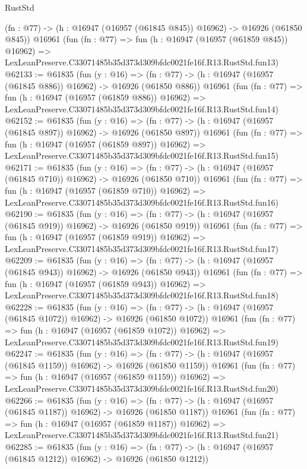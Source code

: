 \begin{lexlean}{RustStd}
\begin{coremodule}
    (fn : @77) -> (h : @16947 (@16957 (@61845 @845)) @16962) -> @16926 (@61850 @845))
    @16961
    (fun (fn : @77) =>
    fun (h : @16947 (@16957 (@61859 @845)) @16962) =>
    LexLeanPreserve.C33071485b35d373d309bfdc0021fe16f.R13.RustStd.fun13)
@62133 := @61835
    (fun (y : @16) =>
    (fn : @77) -> (h : @16947 (@16957 (@61845 @886)) @16962) -> @16926 (@61850 @886))
    @16961
    (fun (fn : @77) =>
    fun (h : @16947 (@16957 (@61859 @886)) @16962) =>
    LexLeanPreserve.C33071485b35d373d309bfdc0021fe16f.R13.RustStd.fun14)
@62152 := @61835
    (fun (y : @16) =>
    (fn : @77) -> (h : @16947 (@16957 (@61845 @897)) @16962) -> @16926 (@61850 @897))
    @16961
    (fun (fn : @77) =>
    fun (h : @16947 (@16957 (@61859 @897)) @16962) =>
    LexLeanPreserve.C33071485b35d373d309bfdc0021fe16f.R13.RustStd.fun15)
@62171 := @61835
    (fun (y : @16) =>
    (fn : @77) -> (h : @16947 (@16957 (@61845 @710)) @16962) -> @16926 (@61850 @710))
    @16961
    (fun (fn : @77) =>
    fun (h : @16947 (@16957 (@61859 @710)) @16962) =>
    LexLeanPreserve.C33071485b35d373d309bfdc0021fe16f.R13.RustStd.fun16)
@62190 := @61835
    (fun (y : @16) =>
    (fn : @77) -> (h : @16947 (@16957 (@61845 @919)) @16962) -> @16926 (@61850 @919))
    @16961
    (fun (fn : @77) =>
    fun (h : @16947 (@16957 (@61859 @919)) @16962) =>
    LexLeanPreserve.C33071485b35d373d309bfdc0021fe16f.R13.RustStd.fun17)
@62209 := @61835
    (fun (y : @16) =>
    (fn : @77) -> (h : @16947 (@16957 (@61845 @943)) @16962) -> @16926 (@61850 @943))
    @16961
    (fun (fn : @77) =>
    fun (h : @16947 (@16957 (@61859 @943)) @16962) =>
    LexLeanPreserve.C33071485b35d373d309bfdc0021fe16f.R13.RustStd.fun18)
@62228 := @61835
    (fun (y : @16) =>
    (fn : @77) -> (h : @16947 (@16957 (@61845 @1072)) @16962) -> @16926 (@61850 @1072))
    @16961
    (fun (fn : @77) =>
    fun (h : @16947 (@16957 (@61859 @1072)) @16962) =>
    LexLeanPreserve.C33071485b35d373d309bfdc0021fe16f.R13.RustStd.fun19)
@62247 := @61835
    (fun (y : @16) =>
    (fn : @77) -> (h : @16947 (@16957 (@61845 @1159)) @16962) -> @16926 (@61850 @1159))
    @16961
    (fun (fn : @77) =>
    fun (h : @16947 (@16957 (@61859 @1159)) @16962) =>
    LexLeanPreserve.C33071485b35d373d309bfdc0021fe16f.R13.RustStd.fun20)
@62266 := @61835
    (fun (y : @16) =>
    (fn : @77) -> (h : @16947 (@16957 (@61845 @1187)) @16962) -> @16926 (@61850 @1187))
    @16961
    (fun (fn : @77) =>
    fun (h : @16947 (@16957 (@61859 @1187)) @16962) =>
    LexLeanPreserve.C33071485b35d373d309bfdc0021fe16f.R13.RustStd.fun21)
@62285 := @61835
    (fun (y : @16) =>
    (fn : @77) -> (h : @16947 (@16957 (@61845 @1212)) @16962) -> @16926 (@61850 @1212))

\end{coremodule}
\end{lexlean}
